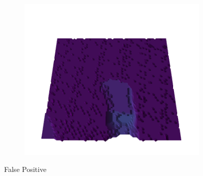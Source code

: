 \documentclass[../document.tex]{subfiles}
\begin{document}
\begin{figure}[H]
    \begin{subfigure}[b]{0.19\textwidth}
        \includegraphics[width=\linewidth]{../img/5/quarry/false_positive//patch-3d-majavi-colormap-4.png}
    \end{subfigure}  

\caption{False Positive}    
\end{figure}
\end{document}
